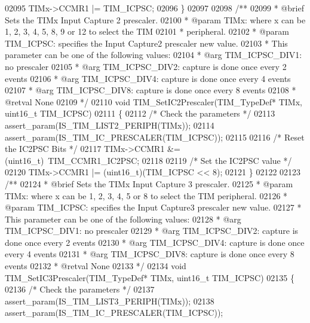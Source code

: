 \begin{DoxyCode}
02095   TIMx->CCMR1 |= TIM\_ICPSC;
02096 \}
02097 
02098 \textcolor{comment}{/**}
02099 \textcolor{comment}{  * @brief  Sets the TIMx Input Capture 2 prescaler.}
02100 \textcolor{comment}{  * @param  TIMx: where x can be 1, 2, 3, 4, 5, 8, 9 or 12 to select the TIM }
02101 \textcolor{comment}{  *         peripheral.}
02102 \textcolor{comment}{  * @param  TIM\_ICPSC: specifies the Input Capture2 prescaler new value.}
02103 \textcolor{comment}{  *          This parameter can be one of the following values:}
02104 \textcolor{comment}{  *            @arg TIM\_ICPSC\_DIV1: no prescaler}
02105 \textcolor{comment}{  *            @arg TIM\_ICPSC\_DIV2: capture is done once every 2 events}
02106 \textcolor{comment}{  *            @arg TIM\_ICPSC\_DIV4: capture is done once every 4 events}
02107 \textcolor{comment}{  *            @arg TIM\_ICPSC\_DIV8: capture is done once every 8 events}
02108 \textcolor{comment}{  * @retval None}
02109 \textcolor{comment}{  */}
02110 \textcolor{keywordtype}{void} TIM_SetIC2Prescaler(TIM\_TypeDef* TIMx, uint16\_t TIM\_ICPSC)
02111 \{
02112   \textcolor{comment}{/* Check the parameters */}
02113   assert_param(IS\_TIM\_LIST2\_PERIPH(TIMx));
02114   assert_param(IS\_TIM\_IC\_PRESCALER(TIM\_ICPSC));
02115 
02116   \textcolor{comment}{/* Reset the IC2PSC Bits */}
02117   TIMx->CCMR1 &= (uint16\_t)~TIM_CCMR1_IC2PSC;
02118 
02119   \textcolor{comment}{/* Set the IC2PSC value */}
02120   TIMx->CCMR1 |= (uint16\_t)(TIM\_ICPSC << 8);
02121 \}
02122 
02123 \textcolor{comment}{/**}
02124 \textcolor{comment}{  * @brief  Sets the TIMx Input Capture 3 prescaler.}
02125 \textcolor{comment}{  * @param  TIMx: where x can be 1, 2, 3, 4, 5 or 8 to select the TIM peripheral.}
02126 \textcolor{comment}{  * @param  TIM\_ICPSC: specifies the Input Capture3 prescaler new value.}
02127 \textcolor{comment}{  *          This parameter can be one of the following values:}
02128 \textcolor{comment}{  *            @arg TIM\_ICPSC\_DIV1: no prescaler}
02129 \textcolor{comment}{  *            @arg TIM\_ICPSC\_DIV2: capture is done once every 2 events}
02130 \textcolor{comment}{  *            @arg TIM\_ICPSC\_DIV4: capture is done once every 4 events}
02131 \textcolor{comment}{  *            @arg TIM\_ICPSC\_DIV8: capture is done once every 8 events}
02132 \textcolor{comment}{  * @retval None}
02133 \textcolor{comment}{  */}
02134 \textcolor{keywordtype}{void} TIM_SetIC3Prescaler(TIM\_TypeDef* TIMx, uint16\_t TIM\_ICPSC)
02135 \{
02136   \textcolor{comment}{/* Check the parameters */}
02137   assert_param(IS\_TIM\_LIST3\_PERIPH(TIMx));
02138   assert_param(IS\_TIM\_IC\_PRESCALER(TIM\_ICPSC));

\end{DoxyCode}

